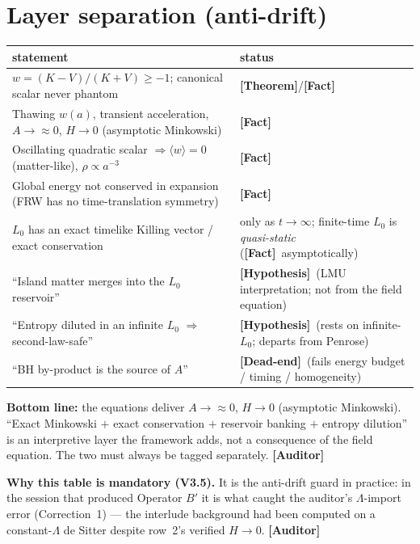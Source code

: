 \documentclass[11pt]{article}
\newcommand{\Fact}{\textbf{\textcolor{green!45!black}{[Fact]}}}
\newcommand{\Hyp}{\textbf{\textcolor{blue!55!black}{[Hypothesis]}}}
\newcommand{\Dead}{\textbf{\textcolor{red!65!black}{[Dead-end]}}}
\newcommand{\Auditor}{\textbf{\textcolor{teal!55!black}{[Auditor]}}}
\newcommand{\Theorem}{\textbf{\textcolor{green!30!black}{[Theorem]}}}
\begin{document}
\section{Layer separation (anti-drift)}
\begin{center}\small
\begin{tabular}{@{}p{}p{}@{}}\toprule
statement & status\\\midrule
$w=(K-V)/(K+V)\ge-1$; canonical scalar never phantom & \Theorem/\Fact\\
Thawing $w(a)$, transient acceleration, $A\to\approx0$, $H\to0$ (asymptotic Minkowski) & \Fact\\
Oscillating quadratic scalar $\Rightarrow\langle w\rangle=0$ (matter-like), $\rho\propto a^{-3}$ & \Fact\\
Global energy not conserved in expansion (FRW has no time-translation symmetry) & \Fact\\
$L_0$ has an exact timelike Killing vector / exact conservation & only as $t\to\infty$; finite-time $L_0$ is \emph{quasi-static} (\Fact\ asymptotically)\\
``Island matter merges into the $L_0$ reservoir'' & \Hyp\ (LMU interpretation; not from the field equation)\\
``Entropy diluted in an infinite $L_0$ $\Rightarrow$ second-law-safe'' & \Hyp\ (rests on infinite-$L_0$; departs from Penrose)\\
``BH by-product is the source of $A$'' & \Dead\ (fails energy budget / timing / homogeneity)\\\bottomrule
\end{tabular}\end{center}
\textbf{Bottom line:} the equations deliver $A\to\approx0$, $H\to0$ (asymptotic Minkowski). ``Exact Minkowski $+$ exact conservation $+$ reservoir banking $+$ entropy dilution'' is an interpretive layer the framework adds, not a consequence of the field equation. The two must always be tagged separately. \Auditor

\textbf{Why this table is mandatory (V3.5).} It is the anti-drift guard in practice: in the session that produced Operator $B'$ it is what caught the auditor's $\Lambda$-import error (Correction~1) --- the interlude background had been computed on a constant-$\Lambda$ de Sitter despite row~2's verified $H\to0$. \Auditor

\end{document}
